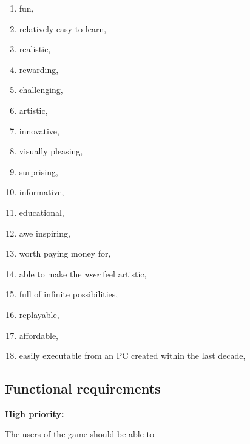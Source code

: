 \begin{multicols}{2}
\begin{enumerate}

  \item fun,

  \item relatively easy to learn,

  \item realistic,

  \item rewarding,

  \item challenging,
  
  \item artistic,
  
  \item innovative,
  
  \item visually pleasing,
  
  \item surprising,
  
  \item informative,
  
  \item educational,
  
  \item awe inspiring,
  
  \item worth paying money for,
  
  \item able to make the \emph{user} feel artistic,
  
  \item full of infinite possibilities,

  \item replayable,

  \item affordable,

  \item easily executable from an PC created within the last decade,

\end{enumerate}
\end{multicols}

\subsection{Functional requirements}

\noindent \textbf{High priority:}

The users of the game should be able to

